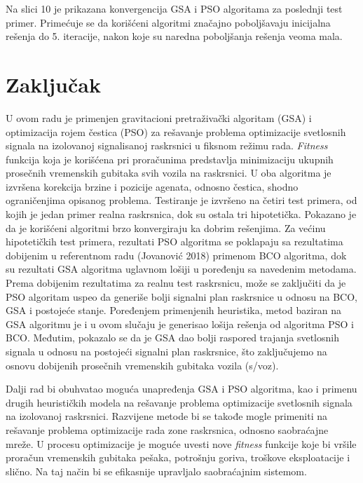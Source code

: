 Na slici 10 je prikazana konvergencija GSA i PSO algoritama za poslednji test primer. Primećuje se da korišćeni algoritmi značajno poboljšavaju inicijalna rešenja do 5. iteracije, nakon koje su naredna poboljšanja rešenja veoma mala.


\section{Zaključak}

U ovom radu je primenjen gravitacioni pretraživački algoritam (GSA) i optimizacija rojem čestica (PSO) za rešavanje problema optimizacije svetlosnih signala na izolovanoj signalisanoj raskrsnici u fiksnom režimu rada. \emph{Fitness} funkcija koja je korišćena pri proračunima predstavlja minimizaciju ukupnih prosečnih vremenskih gubitaka svih vozila na raskrsnici. U oba algoritma je izvršena korekcija brzine i pozicije agenata, odnosno čestica, shodno ograničenjima opisanog problema. Testiranje je izvršeno na četiri test primera, od kojih je jedan primer realna raskrsnica, dok su ostala tri hipotetička. Pokazano je da je korišćeni algoritmi brzo konvergiraju ka dobrim rešenjima. Za većinu hipotetičkih test primera, rezultati PSO algoritma se poklapaju sa rezultatima dobijenim u referentnom radu (Jovanović 2018) primenom BCO algoritma, dok su rezultati GSA algoritma uglavnom lošiji u poređenju sa navedenim metodama. Prema dobijenim rezultatima za realnu test raskrsnicu, može se zaključiti da je PSO algoritam uspeo da generiše bolji signalni plan raskrsnice u odnosu na BCO, GSA i postojeće stanje. Poređenjem primenjenih heuristika, metod baziran na GSA algoritmu je i u ovom slučaju je generisao lošija rešenja od algoritma PSO i BCO. Međutim, pokazalo se da je GSA dao bolji raspored trajanja svetlosnih signala u odnosu na postojeći signalni plan raskrsnice, što zaključujemo na osnovu dobijenih prosečnih vremenskih gubitaka vozila (s/voz).

Dalji rad bi obuhvatao moguća unapređenja GSA i PSO algoritma, kao i primenu drugih heurističkih modela na rešavanje problema optimizacije svetlosnih signala na izolovanoj raskrsnici. Razvijene metode bi se takođe mogle primeniti na rešavanje problema optimizacije rada zone raskrsnica, odnosno saobraćajne mreže. U procesu optimizacije je moguće uvesti nove \emph{fitness} funkcije koje bi vršile proračun vremenskih gubitaka pešaka, potrošnju goriva, troškove eksploatacije i slično. Na taj način bi se efikasnije upravljalo saobraćajnim sistemom. 


